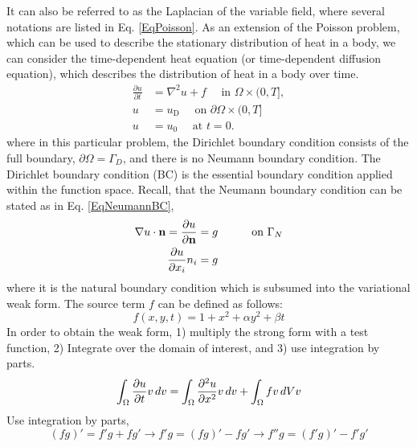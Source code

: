 \documentclass[12pt,3p]{article}
\begin{document}
It can also be referred to as the Laplacian of the variable field, where several notations are listed in Eq. \ref{EqPoisson}.
As an extension of the Poisson problem, which can be used to describe the stationary distribution of heat in a body, we can consider the time-dependent heat equation (or time-dependent diffusion equation), which describes the distribution of heat in a body over time. 
\begin{subequations}
\begin{align}
\frac{\partial u}{\partial t} & =\nabla^2 u+f \quad \text { in } \Omega \times(0, T], \\
u & =u_{\mathrm{D}} \quad \text { on } \partial \Omega \times(0, T] \\
u & =u_0 \quad \text { at } t=0 .
\end{align}
\end{subequations}
where in this particular problem, the Dirichlet boundary condition consists of the full boundary, $\partial \Omega = \Gamma_D$, and there is no Neumann boundary condition. The Dirichlet boundary condition (BC) is the essential boundary condition applied within the function space. Recall, that the Neumann boundary condition can be stated as in Eq. \ref{EqNeumannBC},
\begin{subequations}\label{EqNeumannBC}
\begin{align}
\nabla u \cdot \mathbf{n} = \pdv{u}{\mathbf{n}} &= g \quad \quad \quad \text{on } \Gamma_N \\
\pdv{u}{x_i} n_i  &= g
\end{align}
\end{subequations}
where it is the natural boundary condition which is subsumed into the variational weak form. The source term $f$  can be defined as follows:
\begin{equation}\label{EqSourceTerm}
f(x,y, t) = 1 + x^2 + \alpha y^2 + \beta t
\end{equation} 
In order to obtain the weak form, 1) multiply the strong form with a test function, 2) Integrate over the domain of interest, and 3) use integration by parts. 
\begin{align}\label{EqBefIntParts}
\int_{\Omega} \frac{\partial u}{\partial t} v \, dv = \int_{\Omega} \pdv[2]{u}{x} v \, dv + \int_{\Omega} f v \, dVv
\end{align}
Use integration by parts,
\begin{equation}\label{EqIntParts1}
(fg)' = f'g + fg' \rightarrow f'g = (fg)' - fg' \rightarrow f''g = (f'g)' - f'g'
\end{equation}
\end{document}

